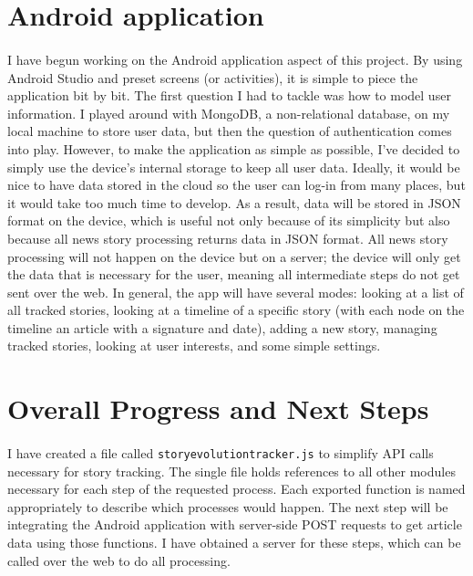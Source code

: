 \documentclass[11pt]{article}
\begin{document}
\section{Android application}
\paragraph{}
I have begun working on the Android application aspect of this project. By using Android Studio and preset screens (or activities), it is simple to piece the application bit by bit. The first question I had to tackle was how to model user information. I played around with MongoDB, a non-relational database, on my local machine to store user data, but then the question of authentication comes into play. However, to make the application as simple as possible, I've decided to simply use the device's internal storage to keep all user data. Ideally, it would be nice to have data stored in the cloud so the user can log-in from many places, but it would take too much time to develop. As a result, data will be stored in JSON format on the device, which is useful not only because of its simplicity but also because all news story processing returns data in JSON format. All news story processing will not happen on the device but on a server; the device will only get the data that is necessary for the user, meaning all intermediate steps do not get sent over the web. In general, the app will have several modes: looking at a list of all tracked stories, looking at a timeline of a specific story (with each node on the timeline an article with a signature and date), adding a new story, managing tracked stories, looking at user interests, and some simple settings. 
 
\section{Overall Progress and Next Steps}
\paragraph{}
I have created a file called \lstinline|storyevolutiontracker.js| to simplify API calls necessary for story tracking. The single file holds references to all other modules necessary for each step of the requested process. Each exported function is named appropriately to describe which processes would happen. The next step will be integrating the Android application with server-side POST requests to get article data using those functions. I have obtained a server for these steps, which can be called over the web to do all processing.
\end{document}
